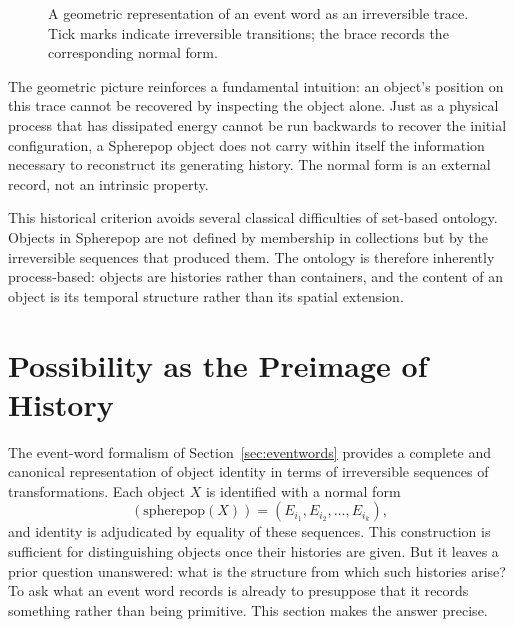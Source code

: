 \documentclass[12pt]{article}
\theoremstyle{plain}
\theoremstyle{definition}
\theoremstyle{remark}
\begin{document}
\begin{figure}[ht]
\centering
{}
\caption{A geometric representation of an event word as an irreversible trace.
Tick marks indicate irreversible transitions; the brace records the
corresponding normal form.}
\label{fig:trace}
\end{figure}

The geometric picture reinforces a fundamental intuition: an object's position
on this trace cannot be recovered by inspecting the object alone.  Just as a
physical process that has dissipated energy cannot be run backwards to recover
the initial configuration, a Spherepop object does not carry within itself the
information necessary to reconstruct its generating history.  The normal form
is an external record, not an intrinsic property.

This historical criterion avoids several classical difficulties of set-based
ontology.  Objects in Spherepop are not defined by membership in collections
but by the irreversible sequences that produced them.  The ontology is
therefore inherently process-based: objects are histories rather than
containers, and the content of an object is its temporal structure rather than
its spatial extension.



\section{Possibility as the Preimage of History}
\label{sec:possibility-preimage}

The event-word formalism of Section~\ref{sec:eventwords} provides a complete
and canonical representation of object identity in terms of irreversible
sequences of transformations.  Each object $X$ is identified with a normal form
\[
  (\mathrm{spherepop}(X)) = (E_{i_1}, E_{i_2}, \dots, E_{i_k}),
\]
and identity is adjudicated by equality of these sequences.  This construction
is sufficient for distinguishing objects once their histories are given.  But it
leaves a prior question unanswered: what is the structure from which such
histories arise?  To ask what an event word records is already to presuppose
that it records something rather than being primitive.  This section makes the
answer precise.
\end{document}
